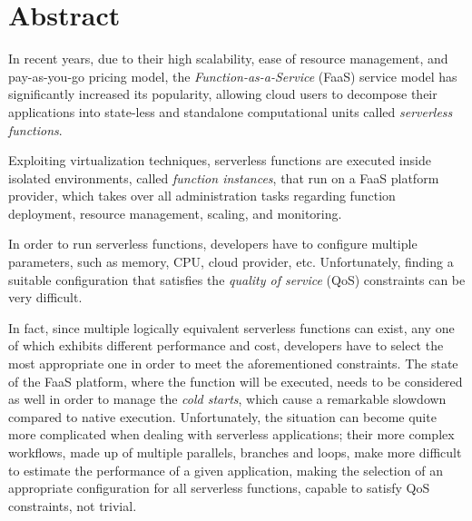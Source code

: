\documentclass[12pt,a4paper]{report}
\begin{document}
\begin{frontespizio} 
	
\end{frontespizio} 
	
\chapter*{Abstract}
	
In recent years, due to their high scalability, ease of resource management, and pay-as-you-go pricing model, the \textit{Function-as-a-Service} (FaaS) service model has significantly increased its popularity, allowing cloud users to decompose their applications into state-less and standalone computational units called \textit{serverless functions}.

Exploiting virtualization techniques, serverless functions are executed inside isolated environments, called \textit{function instances}, that run on a FaaS platform provider, which takes over all administration tasks regarding function deployment, resource management, scaling, and monitoring. 

In order to run serverless functions, developers have to configure multiple parameters, such as memory, CPU, cloud provider, etc. Unfortunately, finding a suitable configuration that satisfies the \textit{quality of service} (QoS) constraints can be very difficult.

In fact, since multiple logically equivalent serverless functions can exist, any one of which exhibits different performance and cost, developers have to select the most appropriate one in order to meet the aforementioned constraints. The state of the FaaS platform, where the function will be executed, needs to be considered as well in order to manage the \textit{cold starts}, which cause a remarkable slowdown compared to native execution. Unfortunately, the situation can become quite more complicated when dealing with serverless applications; their more complex workflows, made up of multiple parallels, branches and loops, make more difficult to estimate the performance of a given application, making the selection of an appropriate configuration for all serverless functions, capable to satisfy QoS constraints, not trivial.
\end{document}
